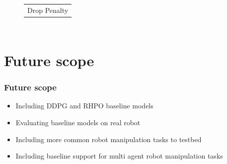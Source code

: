 \documentclass{beamer}
\begin{document}
\begin{frame}
\begin{columns}[c]
\begin{figure}
\begin{tabular}{c}
					{\small Drop Penalty} \\
				\end{tabular}
			\end{figure}
		\end{columns}
	\end{frame}

	\section{Future scope}
	\begin{frame}
		\frametitle{Future scope}
		
		\begin{itemize}
			\item Including DDPG and RHPO baseline models
			\item Evaluating baseline models on real robot
			\item Including more common robot manipulation tasks to testbed
			\item Including baseline support for multi agent robot manipulation tasks
		\end{itemize}
	\end{frame}
\end{document}
